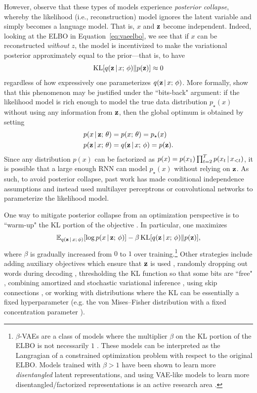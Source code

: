 \documentclass{article}
\begin{document}
However, \citet{Bowman2016} observe that  these types of models
experience \emph{posterior collapse}, whereby the likelihood (i.e., reconstruction)
model ignores the latent variable  and simply becomes a language model. That is, $x$ and $\mathbf{z}$ 
become independent. Indeed, looking at the ELBO in Equation~\eqref{eq:vaeelbo}, we see that if $x$ can be reconstructed \textit{without} $z$, the model is incentivized to make the variational posterior approximately equal to the prior---that is, to have
\[ \operatorname*{KL}[q(\mathbf{z} \,|\, x ; \, \phi) \Vert p(\mathbf{z})] \approx 0\]
regardless of how expressively one parameterizes $q(\mathbf{z} \,|\, x ; \, \phi)$.  More formally, \citet{Chen2017}
show that this phenomenon may be justified under the ``bits-back" argument: if the likelihood
model is rich enough to model the true data distribution $p_\star(x)$ without using any information
from $\mathbf{z}$, then the global optimum is obtained by setting 
\begin{align*}
    p(x \,|\, \mathbf{z} ; \, \theta) &= p(x ; \, \theta) = p_\star(x) \\
    p(\mathbf{z} \,|\, x ; \, \theta) &=  q(\mathbf{z} \,|\, x ; \, \phi) =p(\mathbf{z}).
\end{align*}
Since any distribution $p(x)$ can be factorized as $p(x) = p(x_1)\prod_{t=2}^T p(x_t \,|\, x_{<t})$, it is possible that a large enough RNN can model $p_\star(x)$ without
relying on $\mathbf{z}$. As such, to avoid posterior collapse, past work has made conditional independence assumptions and instead used multilayer perceptrons \citep{Miao2016,miao2017nvi} or convolutional networks \citep{Yang2017,Semeniuta2017,shen2018deconv} to parameterize the likelihood model.

One way to mitigate posterior collapse from an optimization perspective is 
to ``warm-up" the KL portion of the objective \citep{Bowman2016,Son2016}. In particular, 
one maximizes
\[ \mathbb{E}_{q(\mathbf{z} \,|\, x ; \, \phi)}[\log p(x \,|\, \mathbf{z} ; \, \phi)] - \beta  \operatorname*{KL}[q(\mathbf{z} \,|\, x ; \, \phi) \Vert p(\mathbf{z})], \]
where $\beta$ is gradually increased from $0$ to $1$ over training.\footnote{$\beta$-VAEs are a class of models where the multiplier $\beta$ on the KL portion of the ELBO is not necessarily $1$ \citep{higgins2017}. These models can be interpreted as the Langragian of a constrained optimization problem
with respect to the original ELBO.
Models trained with $\beta > 1$ have been shown to learn more \emph{disentangled}
latent representations, and using VAE-like models to learn more disentangled/factorized representations is an active
research area \citep{Burgess2017,kim2018dist,Chen2018vae}.} 
Other strategies include adding auxiliary objectives which ensure that $\mathbf{z}$ is used \citep{Dieng2017,Goyal2017b,Wang2018}, randomly dropping out words during
decoding \citep{Bowman2016}, thresholding the KL function so that some bits are ``free" \citep{Kingma2016},
combining amortized and stochastic variational inference \citep{Kim2018},
using skip connections \citep{dieng2018}, or working
with distributions where the KL can be essentially a fixed hyperparameter (e.g. the von Mises--Fisher distribution with a fixed concentration parameter \citep{Guu2017,xu2018}).
\end{document}

